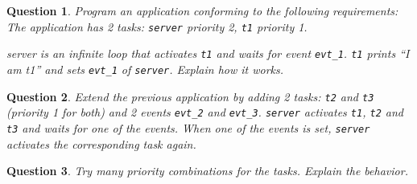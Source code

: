 \documentclass[11pt]{article}
\newtheorem{ex}{Question}
\begin{document}
\begin{ex}
Program an application conforming to the following requirements: The application has 2 tasks:
\texttt{server} priority 2, \texttt{t1} priority 1.

server is an infinite loop that activates \texttt{t1} and waits for event \texttt{evt_1}. \texttt{t1} prints ``I am t1'' and sets \texttt{evt_1} of \texttt{server}. Explain how it works.
\end{ex}

\begin{ex}
Extend the previous application by adding 2 tasks: \texttt{t2} and \texttt{t3} (priority 1 for both) and 2 events \texttt{evt_2} and \texttt{evt_3}. \texttt{server} activates \texttt{t1}, \texttt{t2} and \texttt{t3} and waits for one of the events. When one of the events is set, \texttt{server} activates the corresponding task again.
\end{ex}

\begin{ex}
Try many priority combinations for the tasks. Explain the behavior.
\end{ex}
\end{document}
